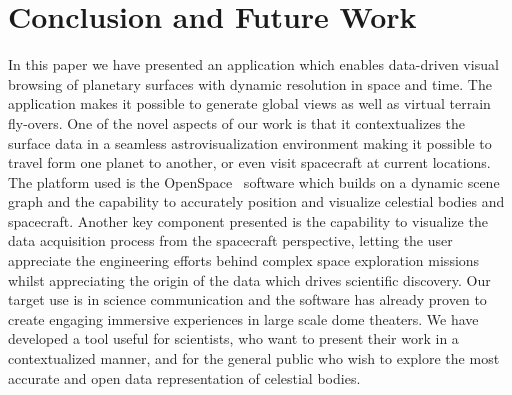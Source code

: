 \documentclass[journal]{vgtc}                %
\newcommand{\fig}[1]{Figure~\ref{fig:#1}}
\begin{document}


\section{Conclusion and Future Work} \label{sec:conclusion}
In this paper we have presented an application which enables data-driven visual browsing of planetary surfaces with dynamic resolution in space and time.
The application makes it possible to generate global views as well as virtual terrain fly-overs.
One of the novel aspects of our work is that it contextualizes the surface data in a seamless astrovisualization environment making it possible to travel form one planet to another, or even visit spacecraft at current locations.
The platform used is the OpenSpace~\cite{Bock_2015} software which builds on a dynamic scene graph and the capability to accurately position and visualize celestial bodies and spacecraft.
Another key component presented is the capability to visualize the data acquisition process from the spacecraft perspective, letting the user appreciate the engineering efforts behind complex space exploration missions whilst appreciating the origin of the data which drives scientific discovery.
Our target use is in science communication and the software has already proven to create engaging immersive experiences in large scale dome theaters.
We have developed a tool useful for scientists, who want to present their work in a contextualized manner, and for the general public who wish to explore the most accurate and open data representation of celestial bodies.
\end{document}
